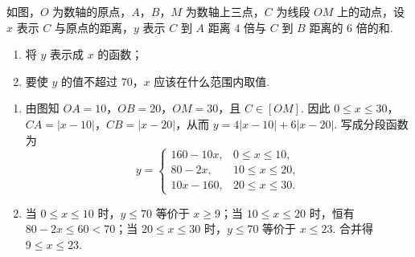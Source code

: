 \begin{problem}
如图，\(O\) 为数轴的原点，\(A\)，\(B\)，\(M\) 为数轴上三点，\(C\) 为线段 \(OM\) 上的动点，设 \(x\) 表示 \(C\) 与原点的距离，\(y\) 表示 \(C\) 到 \(A\) 距离 \(4\) 倍与 \(C\) 到 \(B\) 距离的 \(6\) 倍的和.

\begin{enumerate}
\item 将 \(y\) 表示成 \(x\) 的函数；
\item 要使 \(y\) 的值不超过 \(70\)，\(x\) 应该在什么范围内取值.
\end{enumerate}

\end{problem}

\begin{solution}
\begin{enumerate}
\item 由图知 \(OA=10\)，\(OB=20\)，\(OM=30\)，且 \(C\in[OM]\). 因此 \(0\leqslant x\leqslant30\)，\(CA=|x-10|\)，\(CB=|x-20|\)，从而
\(y=4|x-10|+6|x-20|\). 写成分段函数为
\[
y=\begin{cases}
160-10x,&0\leqslant x\leqslant10,\\
80-2x,&10\leqslant x\leqslant20,\\
10x-160,&20\leqslant x\leqslant30.
\end{cases}
\]
\item 当 \(0\leqslant x\leqslant10\) 时，\(y\leqslant70\) 等价于 \(x\geqslant9\)；当 \(10\leqslant x\leqslant20\) 时，恒有 \(80-2x\leqslant60<70\)；当 \(20\leqslant x\leqslant30\) 时，\(y\leqslant70\) 等价于 \(x\leqslant23\). 合并得 \(9\leqslant x\leqslant23\).
\end{enumerate}
\end{solution}

